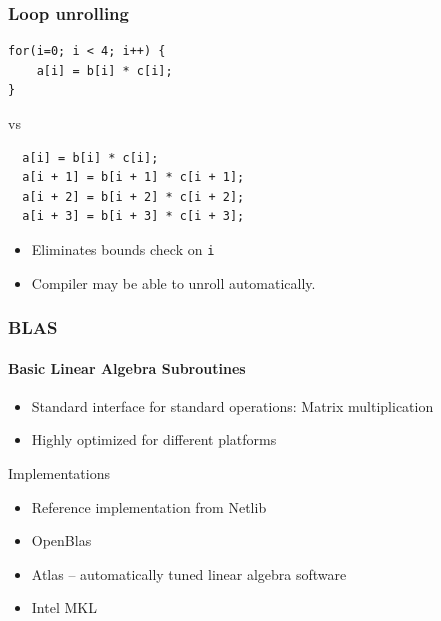 \documentclass[usenames,dvipsnames,mathserif,compress]{beamer}
\begin{document}

\begin{frame}[fragile]
  \frametitle{Loop unrolling}
\begin{lstlisting}
for(i=0; i < 4; i++) {
    a[i] = b[i] * c[i];
}
\end{lstlisting}
vs
\begin{lstlisting}
  a[i] = b[i] * c[i];
  a[i + 1] = b[i + 1] * c[i + 1];
  a[i + 2] = b[i + 2] * c[i + 2];
  a[i + 3] = b[i + 3] * c[i + 3];
\end{lstlisting}
\begin{itemize}
\item Eliminates bounds check on \texttt{i}
\item Compiler may be able to unroll automatically.
\end{itemize}
\end{frame}

\begin{frame}
  \frametitle{BLAS}
  \framesubtitle{Basic Linear Algebra Subroutines}
  \begin{itemize}
  \item Standard interface for standard operations:
    Matrix multiplication
  \item Highly optimized for different platforms
  \end{itemize}
  \begin{block}{Implementations}
    \begin{itemize}
    \item Reference implementation from Netlib
    \item OpenBlas
    \item Atlas -- automatically tuned linear algebra software
    \item Intel MKL
    \end{itemize}
  \end{block}
\end{frame}

\end{document}
